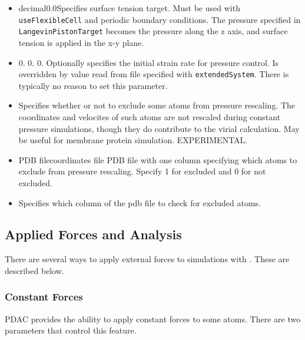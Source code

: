 \begin{itemize}
\item
{}
{decimal}{0.0}{Specifies surface tension target.  Must be used with 
{\tt useFlexibleCell} and periodic boundary conditions.  The pressure 
specified in {\tt LangevinPistonTarget} becomes the pressure along the z
axis, and surface tension is applied in the x-y plane.}

\item
{}
{0. 0. 0.}
{Optionally specifies the initial strain rate for pressure control.
Is overridden by value read from file specified with {\tt extendedSystem}.
There is typically no reason to set this parameter.}

\item
{}
{Specifies whether or not to exclude some atoms from pressure rescaling.  The
coordinates and velocites of such atoms are not rescaled during constant
pressure simulations, though they do contribute to the virial calculation. 
May be useful for membrane protein simulation.  EXPERIMENTAL.}

\item
{}
{PDB file}{coordinates file}
{PDB file with one column specifying which atoms to exclude from pressure
rescaling.  Specify 1 for excluded and 0 for not excluded.}

\item
{}
{Specifies which column of the pdb file to check for excluded atoms.}

\end{itemize}

\subsection{Applied Forces and Analysis}

There are several ways to apply external forces to simulations with \PDAC.
These are described below.


\subsubsection{Constant Forces}

PDAC provides the ability to apply constant forces to some atoms.
There are two parameters that control this feature.

